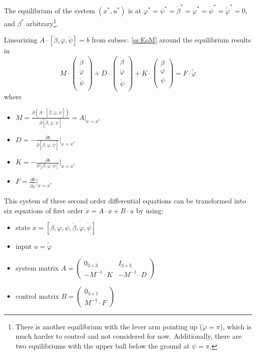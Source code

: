 \documentclass{article}
\begin{document}
The equilibrium of the system $(x^*, u^*)$ is at $\varphi^* = \psi^* = \dot{\beta}^* = \dot{\varphi}^* = \dot{\psi}^* = \breve{\dot{\varphi}}^* = 0$, and $\beta^*$ arbitrary\footnote{
There is another equilibrium with the lever arm pointing up ($\dot{\varphi} = \pi$), which is much harder to control and not considered for now. Additionally, there are two equilibriums with the upper ball below the ground at $\psi = \pi$.}.

Linearizing $A \cdot [\ddot{\beta}, \ddot{\varphi}, \ddot{\psi}] = b$ from subsec. \ref{ss:EoM} around the equilibrium results in
\begin{equation}
M \cdot \left( {\begin{array}{c} \ddot{\beta} \\ \ddot{\varphi} \\ \ddot{\psi} \\ \end{array} } \right) +
D \cdot \left( {\begin{array}{c} \dot{\beta} \\ \dot{\varphi} \\ \dot{\psi} \\ \end{array} } \right) +
K \cdot \left( {\begin{array}{c} \beta \\ \varphi \\ \psi \\ \end{array} } \right) =
F \cdot \breve{\dot{\varphi}}
\end{equation}
where
\begin{itemize}
	\item $M = \frac{\partial \left(A \cdot [\ddot{\beta}, \ddot{\varphi}, \ddot{\psi}] \right)}{\partial [\ddot{\beta}, \ddot{\varphi}, \ddot{\psi}]} = A\Big|_{x=x^*}$
	\item $D = -\frac{\partial b}{\partial [\dot{\beta}, \dot{\varphi}, \dot{\psi}]}\Big|_{x=x^*}$
	\item $K = -\frac{\partial b}{\partial [\beta, \varphi, \psi]}\Big|_{x=x^*}$
	\item $F = \frac{\partial b}{\partial \breve{\dot{\varphi}}}\Big|_{x=x^*}$
\end{itemize}
This system of three second order differential equations can be transformed into six equations of first order $\dot{x} = A \cdot x + B \cdot u$ by using:
\begin{itemize}
	\item state $x = [\beta, \varphi, \psi, \dot{\beta}, \dot{\varphi}, \dot{\psi}]$
	\item input $u = \breve{\dot{\varphi}}$
	\item system matrix $A = \left( {\begin{array}{cc} 0_{3 \times 3} & I_{3 \times 3} \\ -M^{-1} \cdot K & -M^{-1} \cdot D  \end{array} } \right)$
	\item control matrix $B = \left( {\begin{array}{c} 0_{3 \times 1} \\ M^{-1} \cdot F \end{array} } \right)$
\end{itemize}
\end{document}
